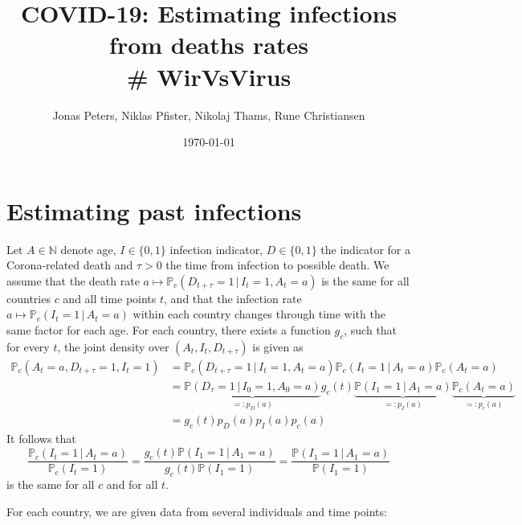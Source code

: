 \documentclass[a4paper]{article}
\title{COVID-19: Estimating infections from deaths rates \\ \# WirVsVirus}
\author{Jonas Peters, Niklas Pfister, Nikolaj Thams, Rune Christiansen}
\date{\today}
\newcommand\N{\mathbb{N}}
\renewcommand\P{\mathbb{P}}
\newcommand{\given}{\, \vert \,}
\begin{document}
\maketitle

\section{Estimating past infections}

Let $A \in \N$ denote age, $I \in \{0,1\}$ infection indicator, $D \in \{0,1\}$ the indicator for a Corona-related death and $\tau > 0$
the time from infection to possible death. We assume that the death rate $a \mapsto \P_c(D_{t+\tau} = 1 \given I_t = 1, A_t = a)$ is 
the same for all countries $c$ and all time points $t$, and that the infection rate $a \mapsto \P_c(I_{t} = 1 \given A_t = a)$ within 
each country changes through time with the same factor for each age. For each country, there exists a function $g_c$, such that for every $t$, the joint
density over $(A_t,I_t,D_{t+\tau})$ is given as
%
\begin{align*}
\P_c(A_t = a, D_{t+\tau} = 1, I_t = 1)	&= \P_c(D_{t+\tau} = 1 \given I_t = 1, A_t = a)  \P_c(I_t = 1 \given A_t = a) \P_c(A_t = a) \\
															&= \underbrace{\P(D_{\tau} = 1 \given I_0 = 1, A_0 = a)}_{=:p_D(a)} g_c(t) \underbrace{\P(I_1 = 1 \given A_1 = a)}_{=:p_I(a)} \underbrace{\P_c(A_t = a)}_{=:p_c(a)} \\
															&=  g_c(t) p_D(a) p_I(a) p_c(a)
\end{align*}
%
It follows that 
$$
\frac{\P_c(I_t = 1 \given A_t = a)}{\P_c(I_t = 1)} = \frac{g_c(t) \P(I_1 = 1 \given A_1 = a)}{g_c(t) \P(I_1 = 1)} = \frac{\P(I_1 = 1 \given A_1 = a)}{ \P(I_1 = 1)}
$$
is the same for all $c$ and for all $t$. 


For each country, we are given data from several individuals and time points:
\end{document}
